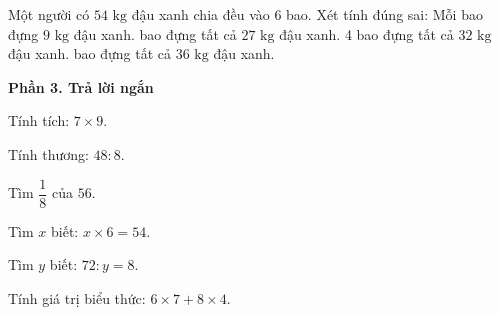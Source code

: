 \begin{ex} %
Một người có $54\text{ kg}$ đậu xanh chia đều vào 6 bao. Xét tính đúng sai:
\choiceTF
{\True Mỗi bao đựng $9\text{ kg}$ đậu xanh.}
{ bao đựng tất cả $27\text{ kg}$ đậu xanh.}
{4 bao đựng tất cả $32\text{ kg}$ đậu xanh.}
{ bao đựng tất cả $36\text{ kg}$ đậu xanh.}
\end{ex}

\textbf{Phần 3. Trả lời ngắn}

\begin{ex} %
Tính tích: $7 \times 9$.
\end{ex}

\begin{ex} %
Tính thương: $48 : 8$.
\end{ex}

\begin{ex} %
Tìm $\dfrac{1}{8}$ của $56$.
\end{ex}

\begin{ex} %
Tìm $x$ biết: $x \times 6 = 54$.
\end{ex}

\begin{ex} %
Tìm $y$ biết: $72 : y = 8$.
\end{ex}

\begin{ex} %
Tính giá trị biểu thức: $6 \times 7 + 8 \times 4$.
\end{ex}
